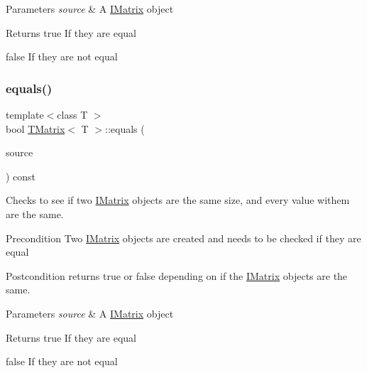 \begin{DoxyParams}{Parameters}
{\em source} & A \mbox{\hyperlink{class_i_matrix}{I\+Matrix}} object \\
\hline
\end{DoxyParams}
\begin{DoxyReturn}{Returns}
true If they are equal 

false If they are not equal 
\end{DoxyReturn}
\mbox{\label{class_t_matrix_ae37de1485648f8d68e57503d9c3996ed}} 
\subsubsection{\texorpdfstring{equals()}{equals()}\hspace{0.1cm}{\footnotesize\ttfamily [5/6]}}
{\footnotesize\ttfamily template$<$class T $>$ \\
bool \mbox{\hyperlink{class_t_matrix}{T\+Matrix}}$<$ T $>$\+::equals (\begin{DoxyParamCaption}\item[{const \mbox{\hyperlink{class_i_matrix}{I\+Matrix}}$<$ \mbox{\hyperlink{class_s_matrix}{S\+Matrix}}$<$ T $>$, T $>$ \&}]{source }\end{DoxyParamCaption}) const}



Checks to see if two \mbox{\hyperlink{class_i_matrix}{I\+Matrix}} objects are the same size, and every value withem are the same. 

\begin{DoxyPrecond}{Precondition}
Two \mbox{\hyperlink{class_i_matrix}{I\+Matrix}} objects are created and needs to be checked if they are equal 
\end{DoxyPrecond}
\begin{DoxyPostcond}{Postcondition}
returns true or false depending on if the \mbox{\hyperlink{class_i_matrix}{I\+Matrix}} objects are the same.
\end{DoxyPostcond}

\begin{DoxyParams}{Parameters}
{\em source} & A \mbox{\hyperlink{class_i_matrix}{I\+Matrix}} object \\
\hline
\end{DoxyParams}
\begin{DoxyReturn}{Returns}
true If they are equal 

false If they are not equal 
\end{DoxyReturn}
\mbox{\label{class_t_matrix_ab0f81ead2c1dab7c33185f847e59c10a}} 
